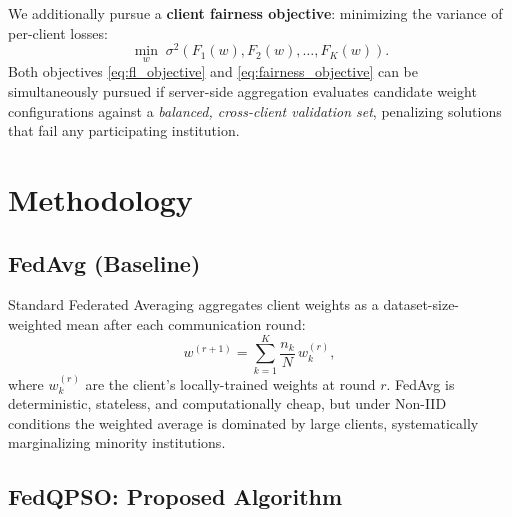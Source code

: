 \documentclass[conference]{IEEEtran}
\begin{document}
We additionally pursue a \textbf{client fairness objective}: minimizing the
variance of per-client losses:
\begin{equation}
    \min_{w}\; \sigma^2\!\left(F_1(w), F_2(w), \ldots, F_K(w)\right).
    \label{eq:fairness_objective}
\end{equation}
Both objectives \eqref{eq:fl_objective} and \eqref{eq:fairness_objective} can
be simultaneously pursued if server-side aggregation evaluates candidate
weight configurations against a \emph{balanced, cross-client validation set},
penalizing solutions that fail any participating institution.

\section{Methodology}
\label{sec:method}

\subsection{FedAvg (Baseline)}
Standard Federated Averaging \cite{mcmahan2017} aggregates client weights as
a dataset-size-weighted mean after each communication round:
\begin{equation}
    w^{(r+1)} = \sum_{k=1}^{K} \frac{n_k}{N}\, w_k^{(r)},
    \label{eq:fedavg}
\end{equation}
where $w_k^{(r)}$ are the client's locally-trained weights at round $r$.
FedAvg is deterministic, stateless, and computationally cheap, but under
Non-IID conditions the weighted average is dominated by large clients,
systematically marginalizing minority institutions.

\subsection{FedQPSO: Proposed Algorithm}
\end{document}
